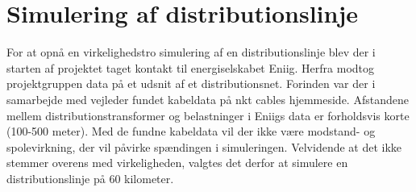 \section{Simulering af distributionslinje}
For at opnå en virkelighedstro simulering af en distributionslinje blev der i starten af projektet taget kontakt til energiselskabet Eniig. Herfra modtog projektgruppen data på et udsnit af et distributionsnet. Forinden var der i samarbejde med vejleder fundet kabeldata på nkt cables hjemmeside. Afstandene mellem distributionstransformer og belastninger i Eniigs data er forholdsvis korte (100-500 meter). Med de fundne kabeldata vil der ikke være modstand- og spolevirkning, der vil påvirke spændingen i simuleringen. Velvidende at det ikke stemmer overens med virkeligheden, valgtes det derfor at simulere en distributionslinje på 60 kilometer. 



